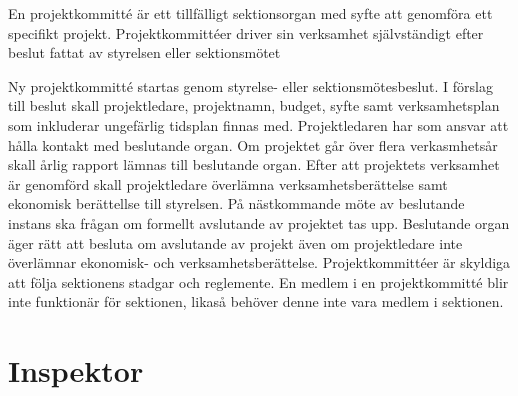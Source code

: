 \documentclass[stadgar]{dsekprotokoll}
\begin{document}
En projektkommitté är ett tillfälligt sektionsorgan med syfte att genomföra ett specifikt projekt. Projektkommittéer driver sin verksamhet självständigt efter beslut fattat av styrelsen eller sektionsmötet
\begin{stadgeavsnitt}
Ny projektkommitté startas genom styrelse- eller sektionsmötesbeslut. I förslag till beslut skall projektledare, projektnamn, budget, syfte samt verksamhetsplan som inkluderar ungefärlig tidsplan finnas med.
 Projektledaren har som ansvar att hålla kontakt med beslutande organ.
Om projektet går över flera verkasmhetsår skall årlig rapport lämnas till beslutande organ.
Efter att projektets verksamhet är genomförd skall projektledare överlämna verksamhetsberättelse samt ekonomisk berättellse till styrelsen. På nästkommande möte av beslutande instans ska frågan om formellt avslutande av projektet tas upp. Beslutande organ äger rätt att besluta om avslutande av projekt även om projektledare inte överlämnar ekonomisk- och verksamhetsberättelse.
 Projektkommittéer är skyldiga att följa sektionens stadgar och reglemente.
En medlem i en projektkommitté blir inte funktionär för sektionen, likaså behöver denne inte vara medlem i sektionen.
\end{stadgeavsnitt}

\section{Inspektor}
\end{document}
